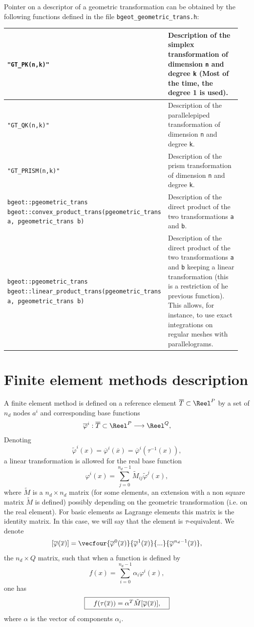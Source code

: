 \documentclass[11pt,a4paper]{article}
\begin{document}
Pointer on a descriptor of a geometric transformation can be obtained by the following functions defined in the file {\tt bgeot\_geometric\_trans.h}:

\begin{center} \begin{tabular}{|m{0.55\linewidth}|m{0.4\linewidth}|} \hline
{\tt "GT\_PK(n,k)"} & Description of the simplex transformation of dimension {\tt n} and degree {\tt k} (Most of the time, the degree 1 is used).\\ \hline
{\tt "GT\_QK(n,k)"} & Description of the parallelepiped transformation of dimension {\tt n} and degree {\tt k}.\\ \hline
{\tt "GT\_PRISM(n,k)"} & Description of the prism transformation of dimension {\tt n} and degree {\tt k}. \\ \hline
{\tt bgeot::pgeometric\_trans bgeot::convex\_product\_trans(pgeometric\_trans a, pgeometric\_trans b)} & Description of the direct product of the two transformations {\tt a} and {\tt b}.\\ \hline
{\tt bgeot::pgeometric\_trans bgeot::linear\_product\_trans(pgeometric\_trans a, pgeometric\_trans b)} & Description of the direct product of the two transformations {\tt a} and {\tt b} keeping a linear transformation (this is a restriction of he previous function). This allows, for instance, to use exact integrations on regular meshes with parallelograms.\\ \hline
\end{tabular} \end{center}

\section{Finite element methods description}

A finite element method is defined on a reference element $\overline{T} \subset \Reel^P$ by a set of $n_d$ nodes $a^i$ and corresponding base functions 
$$ \overline{\varphi}^i : \overline{T} \subset \Reel^P \longrightarrow \Reel^Q, $$
Denoting
$$ \tilde{\varphi}^i(x) = \overline{\varphi}^i(\overline{x}) = \overline{\varphi}^i(\tau^{-1}(x)), $$
a linear transformation is allowed for the real base function
$$ \varphi^i(x) = \sum_{j = 0}^{n_d - 1} \tilde{M}_{ij} \tilde{\varphi}^j(x), $$
where $\tilde{M}$ is a $n_d \times n_d$ matrix (for some elements, an extension with a non square matrix $\tilde{M}$ is defined) possibly depending on the geometric transformation (i.e. on the real element). For basic elements as Lagrange elements this matrix is the identity matrix. In this case, we will say that the element is $\tau$-equivalent.
We denote
$$ [\overline{\varphi}(\overline{x})] = \vecfour{\overline{\varphi}^0(\overline{x})}{\overline{\varphi}^1(\overline{x})}{...}{\overline{\varphi}^{n_d-1}(\overline{x})}, $$
the $n_d \times Q$ matrix, such that when a function is defined by
$$ f(x) = \sum_{i = 0}^{n_d - 1} \alpha_i \varphi^i(x), $$
one has
$$ \fbox{$\hspace{1em} f(\tau(\overline{x})) = \alpha^T \tilde{M} [\overline{\varphi}(\overline{x})],\hspace{1em}$} $$
where $\alpha$ is the vector of components $\alpha_i$.
\end{document}
